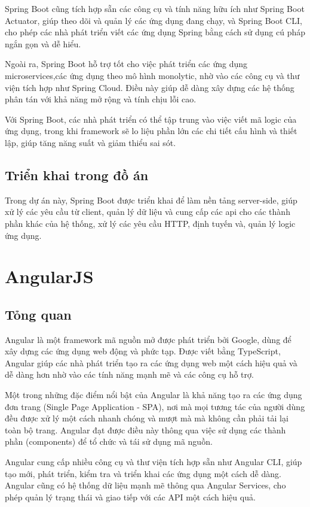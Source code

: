 \documentclass[../DoAn.tex]{subfiles}
\begin{document}
Spring Boot cũng tích hợp sẵn các công cụ và tính năng hữu ích như Spring Boot Actuator, giúp theo dõi và quản lý các ứng dụng đang chạy, và Spring Boot CLI, cho phép các nhà phát triển viết các ứng dụng Spring bằng cách sử dụng cú pháp ngắn gọn và dễ hiểu.

Ngoài ra, Spring Boot hỗ trợ tốt cho việc phát triển các ứng dụng microservices,các ứng dụng theo mô hình monolytic, nhờ vào các công cụ và thư viện tích hợp như Spring Cloud. Điều này giúp dễ dàng xây dựng các hệ thống phân tán với khả năng mở rộng và tính chịu lỗi cao.

Với Spring Boot, các nhà phát triển có thể tập trung vào việc viết mã logic của ứng dụng, trong khi framework sẽ lo liệu phần lớn các chi tiết cấu hình và thiết lập, giúp tăng năng suất và giảm thiểu sai sót.
\subsection{Triển khai trong đồ án}
\label{subsection:3.1.2}
Trong dự án này, Spring Boot được triển khai để làm nền tảng server-side, giúp xử lý các yêu cầu từ client, quản lý dữ liệu và cung cấp các api cho các thành phần khác của hệ thống, xử lý các yêu cầu HTTP, định tuyến và, quản lý logic ứng dụng.

\section{AngularJS}
\label{section:3.2}
\subsection{Tỏng quan}
\label{subsection:3.2.1}
Angular \cite{jain2014angularjs} là một framework mã nguồn mở được phát triển bởi Google, dùng để xây dựng các ứng dụng web động và phức tạp. Được viết bằng TypeScript, Angular giúp các nhà phát triển tạo ra các ứng dụng web một cách hiệu quả và dễ dàng hơn nhờ vào các tính năng mạnh mẽ và các công cụ hỗ trợ.

Một trong những đặc điểm nổi bật của Angular là khả năng tạo ra các ứng dụng đơn trang (Single Page Application - SPA), nơi mà mọi tương tác của người dùng đều được xử lý một cách nhanh chóng và mượt mà mà không cần phải tải lại toàn bộ trang. Angular đạt được điều này thông qua việc sử dụng các thành phần (components) để tổ chức và tái sử dụng mã nguồn.

Angular cung cấp nhiều công cụ và thư viện tích hợp sẵn như Angular CLI, giúp tạo mới, phát triển, kiểm tra và triển khai các ứng dụng một cách dễ dàng. Angular cũng có hệ thống dữ liệu mạnh mẽ thông qua Angular Services, cho phép quản lý trạng thái và giao tiếp với các API một cách hiệu quả.
\end{document}
